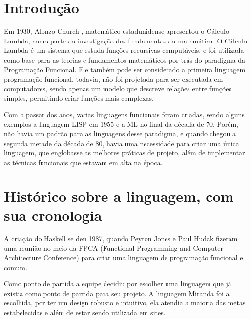 \documentclass[
	article,			%
	11pt,				%
	oneside,			%
	a4paper,			%
	english,			%
	brazil,				%
	sumario=tradicional
	]{abntex2}
\begin{document}
 


    \frenchspacing

    \imprimircapa

    \tableofcontents*

    \textual

    \newpage
    \chapter{Introdução}

    Em 1930, Alonzo Church , matemático estadunidense apresentou o Cálculo Lambda, como parte da investigação dos fundamentos da matemática. O Cálculo Lambda é um sistema que
    estuda funções recursivas computáveis, e foi utilizada como base para as teorias e fundamentos matemáticos por trás do paradigma da Programação Funcional. Ele também
    pode ser considerado a primeira linguagem programação funcional, todavia, não foi projetada para ser executada em computadores, sendo apenas um modelo que descreve relações entre funções
    simples, permitindo criar funções mais complexas.

    Com o passar dos anos, varias linguagens funcionais foram criadas, sendo alguns exemplos a linguagem LISP em 1955 e a ML no final da década de 70. Porém, não
    havia um padrão para as linguagens desse paradigma, e quando chegou a segunda metade da década de 80, havia uma necessidade para criar uma única linguagem, que englobasse
    as melhores práticas de projeto, além de implementar as técnicas funcionais que estavam em alta na época.


    \newpage
    \chapter{Histórico sobre a linguagem, com sua cronologia}

    A criação do Haskell se deu 1987, quando Peyton Jones e Paul Hudak fizeram uma reunião no meio da FPCA (Functional  Programming and Computer Architecture Conference)
    para criar uma linguagem de programação funcional e comum. 
    
    Como ponto de partida a equipe decidiu por escolher uma linguagem que já existia como ponto de partida para seu projeto.
    A linguagem Miranda foi a escolhida, por ter um design robusto e intuitivo, ela atendia a maioria das metas estabelecidas e 
    além de estar sendo utilizada em sites. 
\end{document}
